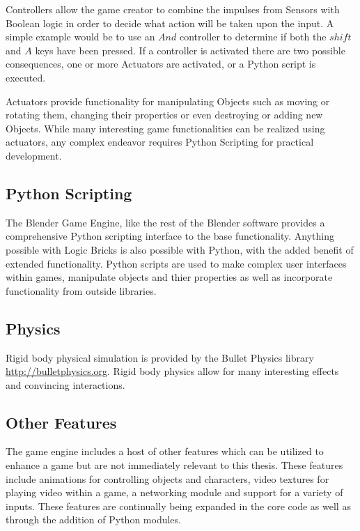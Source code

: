 Controllers allow the game creator to combine the impulses from Sensors with
Boolean logic in order to decide what action will be taken upon the input. A
simple example would be to use an $And$ controller to determine if both the
$shift$ and $A$ keys have been pressed. If a controller is activated there are
two possible consequences, one or more Actuators are activated, or a Python
script is executed.


Actuators provide functionality for manipulating Objects such as moving or
rotating them, changing their properties or even destroying or adding new
Objects. While many interesting game functionalities can be realized using
actuators, any complex endeavor requires Python Scripting for practical
development.

\subsection{Python Scripting}
The Blender Game Engine, like the rest of the Blender software provides a
comprehensive Python scripting interface to the base functionality. Anything
possible with Logic Bricks is also possible with Python, with the added benefit
of extended functionality. Python scripts are used to make complex user
interfaces within games, manipulate objects and thier properties as well as
incorporate functionality from outside libraries.


\subsection{Physics}
Rigid body physical simulation is provided by the Bullet Physics library
\url{http://bulletphysics.org}. Rigid body physics allow for many interesting
effects and convincing interactions.



\subsection{Other Features}

The game engine includes a host of other features which can be utilized to
enhance a game but are not immediately relevant to this thesis. These features
include animations for controlling objects and characters, video textures for
playing video within a game, a networking module and support for a variety of
inputs. These features are continually being expanded in the core code as well as through
the addition of Python modules. 





